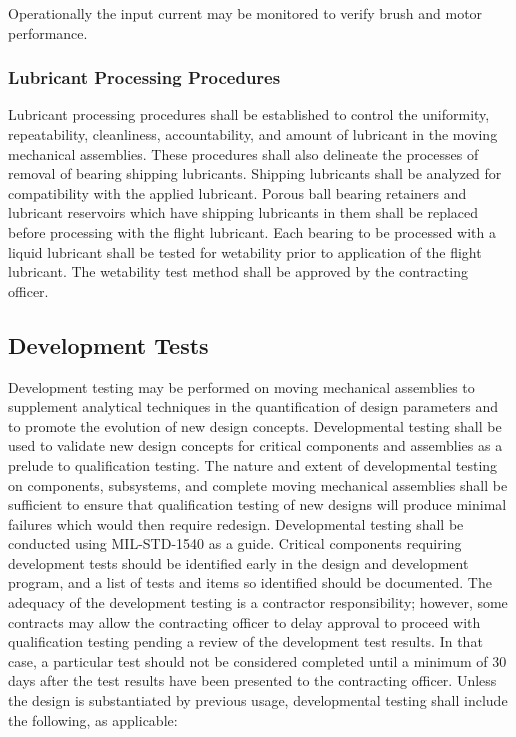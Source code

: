 \documentclass[12pt]{article}
\begin{document}
Operationally the input current may be monitored to verify brush and motor performance.

\subsubsection{Lubricant Processing Procedures} %
Lubricant processing procedures shall be established to control the uniformity, repeatability, cleanliness, accountability, and amount of lubricant in the moving mechanical assemblies. 
These procedures shall also delineate the processes of removal of bearing shipping lubricants. 
Shipping lubricants shall be analyzed for compatibility with the applied lubricant. 
Porous ball bearing retainers and lubricant reservoirs which have shipping lubricants in them shall be replaced before processing with the flight lubricant. 
Each bearing to be processed with a liquid lubricant shall be tested for wetability prior to application of the flight lubricant. 
The wetability test method shall be approved by the contracting officer.

\subsection{Development Tests} %
Development testing may be performed on moving mechanical assemblies to supplement analytical techniques in the quantification of design parameters and to promote the evolution of new design concepts.
Developmental testing shall be used to validate new design concepts for critical components and assemblies as a prelude to qualification testing. 
The nature and extent of developmental testing on components, subsystems, and complete moving mechanical assemblies shall be sufficient to ensure that qualification testing of new designs will produce minimal failures which would then require redesign. 
Developmental testing shall be conducted using MIL-STD-1540 as a guide. 
Critical components requiring development tests should be identified early in the design and development program, and a list of tests and items so identified should be documented. 
The adequacy of the development testing is a contractor responsibility; however, some contracts may allow the contracting officer to delay approval to proceed with qualification testing pending a review of the development test results. 
In that case, a particular test should not be considered completed until a minimum of 30 days after the test results have been presented to the contracting officer. 
Unless the design is substantiated by previous usage, developmental testing shall include the following, as applicable:
\end{document}
